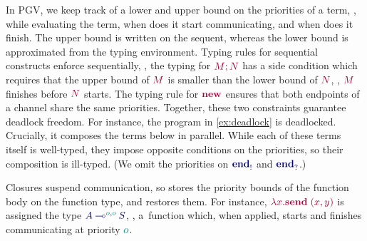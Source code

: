 \documentclass[main.tex]{subfiles}
\begin{document}
In PGV, we keep track of a lower and upper bound on the priorities of a term, \ie, while evaluating the term, when does it start communicating, and when does it finish. The upper bound is written on the sequent, whereas the lower bound is approximated from the typing environment. Typing rules for sequential constructs enforce sequentially, \eg, the typing for $\tm{\andthen{M}{N}}$ has a side condition which requires that the upper bound of $\tm{M}$ is smaller than the lower bound of $\tm{N}$, \ie, $\tm{M}$ finishes before $\tm{N}$ starts. The typing rule for $\tm{\new}$ ensures that both endpoints of a channel share the same priorities. Together, these two constraints guarantee deadlock freedom.
For instance, the program in \cref{ex:deadlock} is deadlocked. Crucially, it composes the terms below in parallel. While each of these terms itself is well-typed, they impose opposite conditions on the priorities, so their composition is ill-typed. (We omit the priorities on $\ty{\tyends}$ and $\ty{\tyendr}$.)
\begin{mathpar}
  \small
  
\end{mathpar}
Closures suspend communication, so  stores the priority bounds of the function body on the function type, and  restores them. For instance, $\tm{\lambda{x}.\send\;\pair{x}{y}}$ is assigned the type $\ty{\tylolli[\cs{o},\cs{o}]{A}{S}}$, \ie, a~function which, when applied, starts and finishes communicating at priority $\cs{o}$.
\end{document}
